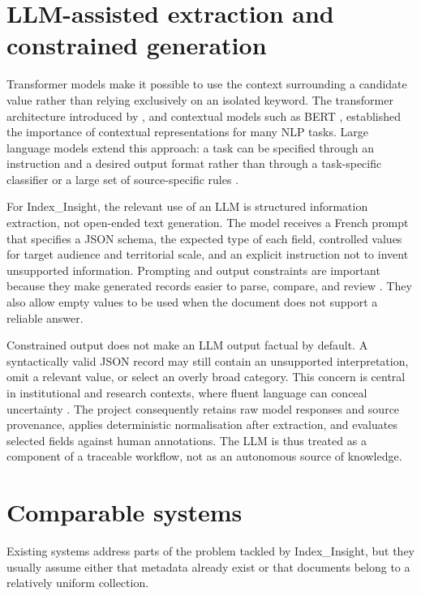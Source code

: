 \section{LLM-assisted extraction and constrained generation}

Transformer models make it possible to use the context surrounding a candidate
value rather than relying exclusively on an isolated keyword. The transformer
architecture introduced by \citet{vaswani2017attention}, and contextual models
such as BERT \citep{devlin2019bert}, established the importance of contextual
representations for many NLP tasks. Large language models extend this approach:
a task can be specified through an instruction and a desired output format
rather than through a task-specific classifier or a large set of source-specific
rules \citep{brown2020language}.

For Index\_Insight, the relevant use of an LLM is structured information
extraction, not open-ended text generation. The model receives a French prompt
that specifies a JSON schema, the expected type of each field, controlled values
for target audience and territorial scale, and an explicit instruction not to
invent unsupported information. Prompting and output constraints are important
because they make generated records easier to parse, compare, and review
\citep{liu2023pre}. They also allow empty values to be used when the document
does not support a reliable answer.

Constrained output does not make an LLM output factual by default. A syntactically
valid JSON record may still contain an unsupported interpretation, omit a
relevant value, or select an overly broad category. This concern is central in
institutional and research contexts, where fluent language can conceal
uncertainty \citep{bommasani2021opportunities}. The project consequently
retains raw model responses and source provenance, applies deterministic
normalisation after extraction, and evaluates selected fields against human
annotations. The LLM is thus treated as a component of a traceable workflow,
not as an autonomous source of knowledge.

\section{Comparable systems}

Existing systems address parts of the problem tackled by Index\_Insight, but
they usually assume either that metadata already exist or that documents belong
to a relatively uniform collection.

